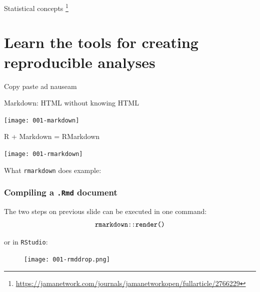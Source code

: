 \documentclass[10pt,handout]{beamer}\usepackage[]{graphicx}\usepackage[]{color}
\begin{document}
\begin{frame}{Statistical concepts}
	\footnote{\tiny \url{https://jamanetwork.com/journals/jamanetworkopen/fullarticle/2766229}}
\end{frame}



\section{Learn the tools for creating reproducible analyses}


\begin{frame}{Copy paste ad nauseam}
\end{frame}


\begin{frame}{Markdown: HTML without knowing HTML}
	\begin{center}
		\texttt{[image: 001-markdown]}
	\end{center}
\end{frame}

\begin{frame}{R + Markdown = RMarkdown}
	\begin{center}
		\texttt{[image: 001-rmarkdown]}
	\end{center}
\end{frame}

\begin{frame}{What \texttt{rmarkdown} does}
	\textbf{} example:
	
	\begin{center}
	\end{center}
\end{frame}


\begin{frame}\frametitle{Compiling a \texttt{.Rmd} document}
	
	\begin{block}{The two steps on previous slide can be executed in one command:}
		\[ \textrm{\texttt{rmarkdown::render()}} \]
	\end{block}
	
	or in \texttt{RStudio}:
	\begin{figure}[h!]
		\centering
		\texttt{[image: 001-rmddrop.png]}
	\end{figure}
\end{frame}
\end{document}
